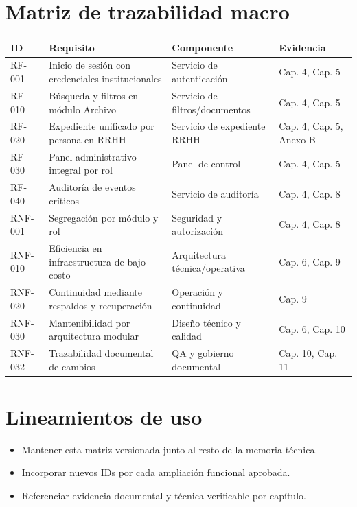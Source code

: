 \section{Matriz de trazabilidad macro}
\begin{longtable}{p{} p{} p{} p{}}
\toprule
\textbf{ID} & \textbf{Requisito} & \textbf{Componente} & \textbf{Evidencia} \\
\midrule
RF-001 & Inicio de sesión con credenciales institucionales & Servicio de autenticación & Cap. 4, Cap. 5 \\
RF-010 & Búsqueda y filtros en módulo Archivo & Servicio de filtros/documentos & Cap. 4, Cap. 5 \\
RF-020 & Expediente unificado por persona en RRHH & Servicio de expediente RRHH & Cap. 4, Cap. 5, Anexo B \\
RF-030 & Panel administrativo integral por rol & Panel de control & Cap. 4, Cap. 5 \\
RF-040 & Auditoría de eventos críticos & Servicio de auditoría & Cap. 4, Cap. 8 \\
RNF-001 & Segregación por módulo y rol & Seguridad y autorización & Cap. 4, Cap. 8 \\
RNF-010 & Eficiencia en infraestructura de bajo costo & Arquitectura técnica/operativa & Cap. 6, Cap. 9 \\
RNF-020 & Continuidad mediante respaldos y recuperación & Operación y continuidad & Cap. 9 \\
RNF-030 & Mantenibilidad por arquitectura modular & Diseño técnico y calidad & Cap. 6, Cap. 10 \\
RNF-032 & Trazabilidad documental de cambios & QA y gobierno documental & Cap. 10, Cap. 11 \\
\bottomrule
\end{longtable}

\section{Lineamientos de uso}
\begin{itemize}
  \item Mantener esta matriz versionada junto al resto de la memoria técnica.
  \item Incorporar nuevos IDs por cada ampliación funcional aprobada.
  \item Referenciar evidencia documental y técnica verificable por capítulo.
\end{itemize}
